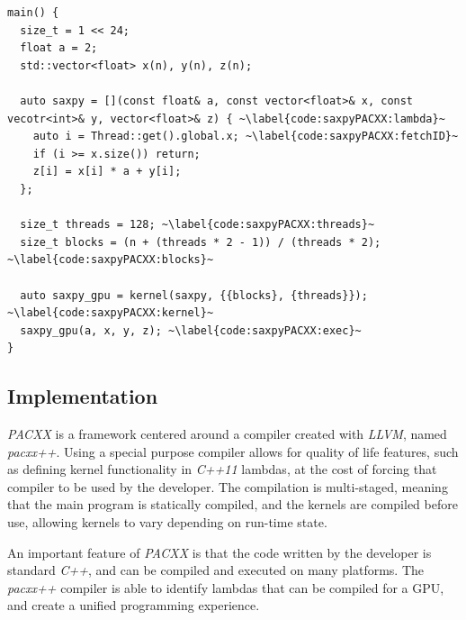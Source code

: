 \begin{lstlisting}[caption={\textit{SAXPY} computation in \textit{PACXX}.}, label={code:saxpyPACXX}]
main() {
  size_t = 1 << 24;
  float a = 2;
  std::vector<float> x(n), y(n), z(n);

  auto saxpy = [](const float& a, const vector<float>& x, const vecotr<int>& y, vector<float>& z) { ~\label{code:saxpyPACXX:lambda}~
    auto i = Thread::get().global.x; ~\label{code:saxpyPACXX:fetchID}~
    if (i >= x.size()) return;
    z[i] = x[i] * a + y[i];
  };

  size_t threads = 128; ~\label{code:saxpyPACXX:threads}~
  size_t blocks = (n + (threads * 2 - 1)) / (threads * 2); ~\label{code:saxpyPACXX:blocks}~

  auto saxpy_gpu = kernel(saxpy, {{blocks}, {threads}}); ~\label{code:saxpyPACXX:kernel}~
  saxpy_gpu(a, x, y, z); ~\label{code:saxpyPACXX:exec}~
}
\end{lstlisting}

\subsection{Implementation}
\textit{PACXX} is a framework centered around a compiler created with \textit{LLVM}, named \textit{pacxx++}. Using a special purpose compiler allows for quality of life features, such as defining kernel functionality in \textit{C++11} lambdas, at the cost of forcing that compiler to be used by the developer. The compilation is multi-staged, meaning that the main program is statically compiled, and the kernels are compiled before use, allowing kernels to vary depending on run-time state.

An important feature of \textit{PACXX} is that the code written by the developer is standard \textit{C++}, and can be compiled and executed on many platforms. The \textit{pacxx++} compiler is able to identify lambdas that can be compiled for a GPU, and create a unified programming experience.


